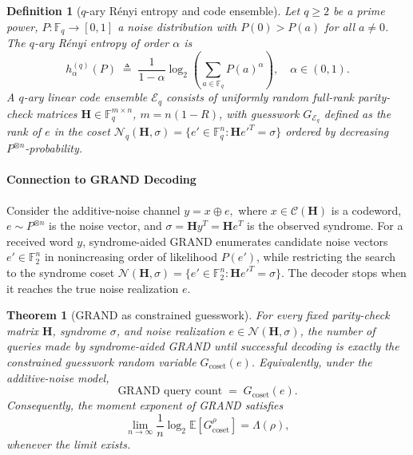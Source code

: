 \documentclass[journal,10pt,onecolumn]{IEEEtran}
\newtheorem{theorem}{Theorem}
\newtheorem{definition}{Definition}
\newcommand{\Fb}{\mathbb{F}}
\newcommand{\Nb}{\mathcal{N}}
\newcommand{\Cb}{\mathcal{C}}
\newcommand{\Hm}{\mathbf{H}}
\begin{document}
\begin{definition}[$q$-ary R\'{e}nyi entropy and code ensemble]
\label{def:qary}
Let $q\ge 2$ be a prime power, $P:\mathbb{F}_q\to[0,1]$ a noise
distribution with $P(0)>P(a)$ for all $a\ne 0$.
The \emph{$q$-ary R\'{e}nyi entropy of order $\alpha$} is
\begin{equation}
    h_\alpha^{(q)}(P)
    \;\triangleq\;
    \frac{1}{1-\alpha}\log_2\!\left(\sum_{a\in\mathbb{F}_q}P(a)^\alpha\right),
    \quad \alpha\in(0,1).
    \label{eq:qary_renyi}
\end{equation}
A \emph{$q$-ary linear code ensemble} $\mathcal{E}_q$ consists of
uniformly random full-rank parity-check matrices
$\Hm\in\mathbb{F}_q^{m\times n}$, $m=n(1-R)$, with guesswork
$G_{\mathcal{E}_q}$ defined as the rank of $e$ in the coset
$\Nb_q(\Hm,\sigma)=\{e'\in\mathbb{F}_q^n:\Hm e'^T=\sigma\}$
ordered by decreasing $P^{\otimes n}$-probability.
\end{definition}



\paragraph{Connection to GRAND Decoding}

Consider the additive-noise channel
\(
y = x \oplus e,
\)
where \(x\in\Cb(\Hm)\) is a codeword, \(e\sim P^{\otimes n}\) is the
noise vector, and \(\sigma=\Hm y^T=\Hm e^T\) is the observed syndrome.
For a received word \(y\), syndrome-aided GRAND enumerates candidate
noise vectors \(e'\in\Fb_2^n\) in nonincreasing order of likelihood
\(P(e')\), while restricting the search to the syndrome coset
\(
\Nb(\Hm,\sigma)=\{e'\in\Fb_2^n:\Hm e'^T=\sigma\}.
\)
The decoder stops when it reaches the true noise realization \(e\).

\begin{theorem}[GRAND as constrained guesswork]
\label{thm:grand_connection}
For every fixed parity-check matrix \(\Hm\), syndrome \(\sigma\), and
noise realization \(e\in\Nb(\Hm,\sigma)\), the number of queries made by
syndrome-aided GRAND until successful decoding is exactly the constrained
guesswork random variable \(G_{\mathrm{coset}}(e)\).
Equivalently, under the additive-noise model,
\[
\text{GRAND query count} \;=\; G_{\mathrm{coset}}(e).
\]
Consequently, the moment exponent of GRAND satisfies
\[
\lim_{n\to\infty}\frac{1}{n}\log_2 \mathbb{E}\!\left[G_{\mathrm{coset}}^\rho\right]
=
\Lambda(\rho),
\]
whenever the limit exists.
\end{theorem}
\end{document}
